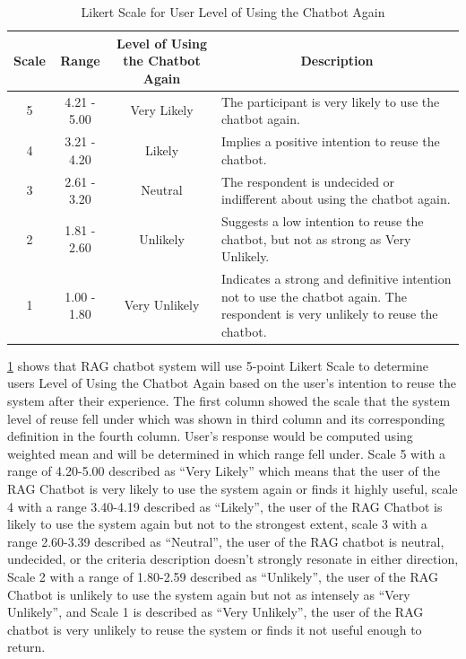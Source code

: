 \begin{refsection}
\begin{table}[H] %
    \centering
    \caption{Likert Scale for User Level of Using the Chatbot Again}
    \label{tab:reuse_scale}
    \footnotesize
    \begin{tabular}{cccp{5cm}}
        \hline
        \textbf{Scale} & \textbf{Range} & \textbf{Level of Using the Chatbot Again} & \multicolumn{1}{c}{\textbf{Description}} \\
        \hline
        5 & 4.21 - 5.00 & Very Likely & The participant is very likely to use the chatbot again.\\
        \hline
        4 & 3.21 - 4.20 & Likely & Implies a positive intention to reuse the chatbot.\\
        \hline
        3 & 2.61 - 3.20 & Neutral & The respondent is undecided or indifferent about using the chatbot again.\\
        \hline
        2 & 1.81 - 2.60 & Unlikely & Suggests a low intention to reuse the chatbot, but not as strong as Very Unlikely.\\
        \hline
        1 & 1.00 - 1.80 & Very Unlikely & Indicates a strong and definitive intention not to use the chatbot again. The respondent is very unlikely to reuse the chatbot.\\
        \hline
    \end{tabular}
\end{table}

\ref{tab:reuse_scale} shows that RAG chatbot system will use 5-point Likert Scale to determine users Level of Using the Chatbot Again based on the user’s intention to reuse the system after their experience. The first column showed the scale that the system level of reuse fell under which was shown in third column and its corresponding definition in the fourth column. User’s response would be computed using weighted mean and will be determined in which range fell under. Scale 5 with a range of 4.20-5.00 described as “Very Likely” which means that the user of the RAG Chatbot is very likely to use the system again or finds it highly useful, scale 4 with a range 3.40-4.19 described as “Likely”, the user of the RAG Chatbot is likely to use the system again but not to the strongest extent, scale 3 with a range 2.60-3.39 described as “Neutral”, the user of the RAG chatbot is neutral, undecided, or the criteria description doesn’t strongly resonate in either direction, Scale 2 with a range of 1.80-2.59 described as “Unlikely”, the user of the RAG Chatbot is unlikely to use the system again but not as intensely as “Very Unlikely”, and Scale 1 is described as “Very Unlikely”, the user of the RAG chatbot is very unlikely to reuse the system or finds it not useful enough to return.


\end{refsection}
